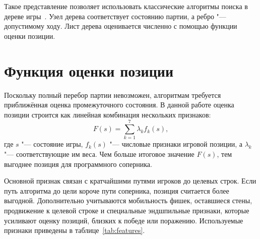 \documentclass{csmathnotes}
\begin{document}
Такое представление позволяет использовать классические алгоритмы поиска в дереве игры~\cite{Russell:2021}. Узел дерева соответствует состоянию партии, а ребро "--- допустимому ходу. Лист дерева оценивается численно с помощью функции оценки позиции.

\section*{Функция оценки позиции}

Поскольку полный перебор партии невозможен, алгоритмам требуется приближённая оценка промежуточного состояния. В данной работе оценка позиции строится как линейная комбинация нескольких признаков:
\[
    F(s) = \sum_{k=1}^{7} \lambda_k f_k(s),
\]
где $s$ "--- состояние игры, $f_k(s)$ "--- числовые признаки игровой позиции, а $\lambda_k$ "--- соответствующие им веса. Чем больше итоговое значение $F(s)$, тем выгоднее позиция для программного соперника.

Основной признак связан с кратчайшими путями игроков до целевых строк. Если путь алгоритма до цели короче пути соперника, позиция считается более выгодной. Дополнительно учитываются мобильность фишек, оставшиеся стены, продвижение к целевой строке и специальные эндшпильные признаки, которые усиливают оценку позиций, близких к победе или поражению. Используемые признаки приведены в таблице~\ref{tab:features}.

\begin{table}[h]
\centering
\caption{Признаки функции оценки позиции}
\label{tab:features}
\end{table}
\end{document}

